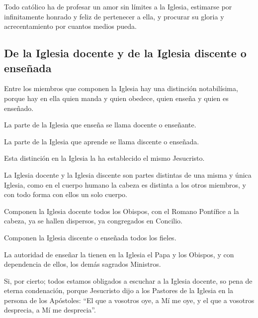  Todo
católico ha de profesar un amor sin límites a la Iglesia, estimarse por infinitamente honrado y feliz de pertenecer a ella, y procurar su gloria y acrecentamiento por cuantos medios pueda.

\subsection{De la Iglesia docente y de la Iglesia discente o enseñada}

Entre los miembros que componen la Iglesia hay una distinción notabilísima,
porque hay en ella quien manda y quien obedece, quien enseña y quien es
enseñado.

 La parte de la Iglesia
que enseña se llama docente o enseñante.

 La parte de la
Iglesia que aprende se llama discente o enseñada.

 Esta distinción en
la Iglesia la ha establecido el mismo Jesucristo.

 La Iglesia docente y la Iglesia discente son partes
distintas de una misma y única Iglesia, como en el cuerpo humano la cabeza es
distinta a los otros miembros, y con todo forma con ellos un solo cuerpo.

 Componen la Iglesia
docente todos los Obispos, con el Romano Pontífice a la cabeza, ya se hallen
dispersos, ya congregados en Concilio.

 Componen
la Iglesia discente o enseñada todos los fieles.

 La
autoridad de enseñar la tienen en la Iglesia el Papa y los Obispos, y con
dependencia de ellos, los demás sagrados Ministros.

 Si, por
cierto; todos estamos obligados a escuchar a la Iglesia docente, so pena de eterna
condenación, porque Jesucristo dijo a los Pastores de la Iglesia en la persona de
los Apóstoles: “El que a vosotros oye, a Mí me oye, y el que a vosotros desprecia,
a Mí me desprecia”.

